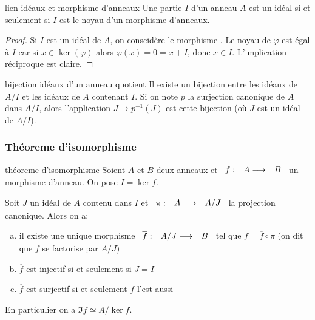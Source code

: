 \begin{proposition}{lien idéaux et morphisme d'anneaux}{}
    Une partie $I$ d'un anneau $A$ est un idéal si et seulement si $I$
    est le noyau d'un morphisme d'anneaux.
\end{proposition}

\begin{proof}
    Si $I$ est un idéal de $A$, on conscidère le morphisme . \newline
    Le noyau de $\varphi$ est égal à $I$ car si $x \in \ker(\varphi)$ alors $\varphi(x) = 0 = x + I$,
    donc $x \in I$.
    L'implication réciproque est claire.
\end{proof}


\begin{theorem}{bijection idéaux d'un anneau quotient}{}
    Il existe un bijection entre les idéaux de $A/I$ et les idéaux de $A$ contenant $I$.\newline
    Si on note $p$ la surjection canonique de $A$ dans $A/I$, 
    alors l'application $J \mapsto p^{-1}(J)$ est cette bijection 
    (où $J$ est un idéal de $A/I$).
\end{theorem}



\subsubsection{Théoreme d'isomorphisme}

\begin{theorem}{théoreme d'isomorphisme}{}
    Soient $A$ et $B$ deux anneaux et $\begin{array}[t]{ccc}f : & A \longrightarrow & B\end{array}$ un morphisme d'anneau.
    On pose $I = \ker{f}$.

    Soit $J$ un idéal de $A$ contenu dans $I$ et $\begin{array}[t]{ccc}\pi : & A \longrightarrow & A/J\end{array}$ la projection canonique. Alors on a:
    \begin{enumerate}[(a)]
        \item il existe une unique morphisme $\begin{array}[t]{ccc}\overline{f} : & A/J \longrightarrow & B\end{array}$ tel que $f = \overline{f} \circ \pi$
                (on dit que $f$ se factorise par $A/J$)
        \item $\overline{f}$ est injectif si et seulement si $J = I$
        \item $\overline{f}$ est surjectif si et seulement $f$ l'est aussi
    \end{enumerate}

    En particulier on a $\Im{f} \simeq A/\ker{f}$.
\end{theorem}



